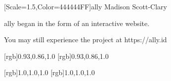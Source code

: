 \documentclass[11pt]{memoir}
\begin{document}
  \frontmatter

  

  \pagestyle{plain}

  \doublespacing

  \null
  \vfill
  \begin{flushright}
    {[Scale=1.5,Color=444444FF]\Huge ally}
    \vfill
    {\Huge Madison Scott-Clary}
  \end{flushright}
  \thispagestyle{empty}

  \newpage

  

  \tableofcontents*
  \newpage
  \null
  \cleardoublepage

  \onehalfspacing

  \null
  \vfill
  \begin{center}
    {\allyFont ally} began in the form of an interactive website.

    You may still experience the project at {\allyFont https://ally.id}
  \end{center}
  \vfill

  \mainmatter

  \pagestyle{ourbook}
  \twosided


  \begin{paracol}{2}
  \begin{leftcolumn}
  
  
  
  
  \end{leftcolumn}
  \end{paracol}
  \begin{paracol}{2}
  \begin{leftcolumn}
  
  
  
  
  
  
  
  \end{leftcolumn}
  \end{paracol}

  [rgb]{0.93,0.86,1.0}
  [rgb]{0.93,0.86,1.0}
  \begin{paracol}{2}
  \begin{leftcolumn}
  
  \end{leftcolumn}
  \end{paracol}
  [rgb]{1.0,1.0,1.0}
  [rgb]{1.0,1.0,1.0}
\end{document}
